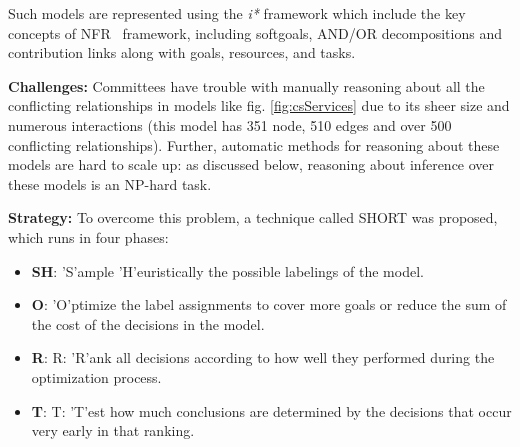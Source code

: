 \documentclass[sigconf,anonymous,review]{acmart}
\begin{document}
Such models are represented using the \textit{i*} framework \cite{yu97a} which include the key concepts of NFR~\cite{mylopoulos92.nfr} framework, including softgoals, AND/OR decompositions and contribution links along with goals, resources, and tasks. 


\noindent\textbf{Challenges: } Committees have trouble with manually reasoning about all the conflicting relationships in models like fig. \ref{fig:csServices} due to its sheer size and numerous interactions (this model has 351 node, 510 edges and over 500 conflicting relationships). Further, automatic methods for reasoning about these models are hard to scale up: as discussed below, reasoning about inference over these models is an NP-hard task. 

\noindent\textbf{Strategy:} To overcome this problem, a technique called SHORT was proposed, which runs in four phases:
\begin{itemize}[leftmargin=*]
    \item{\textbf{SH}: 'S'ample 'H'euristically the possible labelings of the model.}
    \item{\textbf{O}: 'O'ptimize the label assignments to cover more goals or reduce the sum of the cost of the decisions in the model.}
    \item{\textbf{R}: R: 'R'ank all decisions according to how well they performed during the optimization process.}
    \item{\textbf{T}: T: 'T'est how much conclusions are determined by the decisions that occur very early in that ranking.}
\end{itemize}
\end{document}
